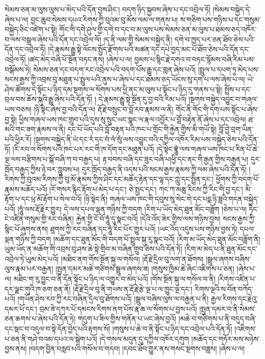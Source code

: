 སེམས་ཅན་མ་ལུས་ལུས་པ་མེད་པའི་དོན་བྱས་ཤིང་། བདག་ཉིད་སྐྱབས་ཞེས་པ་དང་འབྲེལ་ཏོ། །སེམས་བསྐྱེད་དེ་ཞེས་པ་ལ། བྱང་ཆུབ་སེམས་དཔའ་རིགས་ཀྱི་བུའམ་བུ་མོས་ལམ་ལ་གནས་པ། ས་གཅིག་པས་གཉིས་པ་དང་གསུམ་བསྐྱེད་ཅིང་འཛེག་པ་སྟེ། གོང་གི་དགེ་ཤུལ་གྱི་དགེ་བ་དང་བ་མ་ལུས་པས་སེམས་ཅན་མ་ལུས་པ་ཐམས་ཅད་འཁོར་བ་ལས་བསྒྲལ་ཞེས་པའི་དོན་དང་འབྲེལ་ལོ། །ད་ནི་ལམ་གྱི་སེམས་བསྐྱེད་ནི། དགེ་བ་ཁྱད་པར་ཅན་ཐོབ་ཅེས་པའི་དོན་དང་འབྲེལ་ཏོ། །དེ་རྣམས་རྒྱུ་སྟེ་ལོངས་སྤྱོད་རྫོགས་པའི་མཚན་དང་དཔེ་བྱད་མང་པོ་ཐོབ་ཅེས་པའི་དོན་དང་འབྲེལ་ཏོ། །ཚད་མེད་བཞི་པོ་སྔོན་བཏང་ནས། །ཞེས་པ་ལ། བྱམས་པ་སྙིང་རྗེ་དགའ་བ་བཏང་སྙོམས་བཞི་རིམ་པས་བསྒོམས་ཏེ། སེམས་ཅན་དང་བདག་རང་འབྲེལ་པའི་བདག་པོས་རྒྱུ་དང་གླན་ཞེས་པའོ། །སྤྲུལ་པ་དཔག་ཏུ་མེད་པས་སངས་རྒྱས་ཀྱི་འབྲས་བུ་མཐུན་པ་སྤྲུལ་པའི་ནུས་པ་ཞེས་པ་དང་ཐམས་ཅད་ཡོངས་སུ་དག་པ་ལས་ཞེས་པ་ལ། ཡེ་ཤེས་ཚོགས་དེ་སྟོང་པ་ཉིད་དམ་སྔགས་ལ་སོགས་པས་ཕྱི་ནང་མ་ལུས་པ་སྟོང་པ་ཉིད་དུ་གནས་པ་སྟེ། སྤྲོས་པ་དང་བྲལ་བས་ཆོས་སྐུའི་རྒྱུ་ཞེས་པའི་དོན་ཏོ། །
དེ་རྣམས་རྒྱུ་སྟེ་སྔོན་དུ་བྱ་བའི་རིམ་པའོ། །སྔགས་བསྐྱེད་འབྱུང་བ་གཞལ་ཡས་བཅས། །ཉི་སྟེང་ཞེས་བྱ་བའི་དོན་ལ། རྡོ་རྗེ་བསྲུང་བ་བློ་རབ་རྣམས་ལ་ནི། གོང་ནི་གོང་གི་དག་པས་སྟོང་པ་ཞེས་བྱ་སྟེ། ཕྱིས་གཞལ་ཡས་ཁང་གྲུབ་པའི་དུས་སུ་སྲུང་ཡང་སྣང་ལ་རྣལ་འབྱོར་པ་བློ་བརྟེན་ནོ་ཞེས་པ་དང་འབྲེལ། ཐ་མའི་གང་ཟག་རྣམས་ལ་ནི། དང་པོ་ཡོད་པའི་བློ་བརྟན་པའི་ཁང་པ་གྲོང་གི་རྐྱེན་གྱིས་མི་གཡོ་སྟེ། བློ་བྱེ་བྲག་ཡིན་པའི་ཕྱིར་རོ། །སྔགས་བསྐྱེད་ནི་ཡཾ་དང་རཾ་དང་བཾ་ལཾ་སུཾ་ལས་འབྱུང་བའི་དཀྱིལ་འཁོར་རིམ་པས་བསྐྱེད་ཅེས་པའི་དོན་ཏོ། །རི་རབ་ལ་སོགས་པའི་ཁང་པར་རང་གི་ཁ་དོག་དང་མཐུན་པའོ། །དེ་སྟེང་བྷཱུཾ་ལས་གཞལ་ཡས་ཁང་པ་རིན་པོ་ཆེ་ལྔ་ལས་བརྩིགས་པ་སྒོ་བཞི་ཀ་བ་བརྒྱད་པ། རྟ་བབས་བཞི་དང་ཟུར་བཞི་པ།ཕྱི་དང་ནང་གི་རྒྱན་གྱིས་བརྒྱན་པ། དུར་ཁྲོད་བརྒྱད་ཀྱིས་ཉེ་བར་ཀླུབས་པ། དུར་ཁྲོད་བརྒྱད་ནི་འདས་པའི་སངས་རྒྱས་རྣམས་ཀྱི་ལམ་ཞེས་པའི་དོན་ཏོ། །རིགས་ཀྱི་བུའམ་རིགས་ཀྱི་བུ་མོ་རྣམས་ཀྱིས་ཤིང་དང་མཆོད་རྟེན་དང་ལྷ་དང་ཀླུ་དང་སྤྲིན་དང་། ཕྱོགས་ཀྱི་བདག་པོ་རྣམས་མཆོད་པའོ། །རོ་གསར་རྙིང་རྟོག་པ་མེད་པ་དང་། ཅེ་སྤྱང་དང་། ཀང་ཀ་མཆུ་{རིངས་ཀྱི་རིང་གི་}བྱ་དང་། མི་རྟོག་པ་དང་ཕྲ་མོ་རྟོག་པ་སེལ་བའོ། །ཉི་སྟེང་ནི། གཞལ་ཡས་ཁང་གི་དབུས་སུ་སེང་གེ་དང་པདྨ་ཉི་ཟླའི་གདན་བསྐྱེད་པའོ། །ཧཱུཾ་ལས་རྡོ་རྗེར་གྱུར། དེ་ལས་དཔལ་ལྡན་གཉིས་ཀྱི་བདག །རིག་པ་ཡོད་མེད་ཐུན་མོང་བཟློག །ཅེས་པ་ལ། ཏིང་ངེ་འཛིན་གསུམ་གྱི་རང་བཞིན། རྐྱེན་གྱི་ངོ་བོ་ཧཱུཾ་དུ་སྣང་བའོ། །དེའི་འོད་ཟེར་གྱིས་ལས་གཉིས་བྱས། སངས་རྒྱས་ཀྱི་སྙིང་པོ་ཞུགས་ནས། ཐུགས་ཀྱི་རང་བཞིན་དང་ཧཱུཾ་རིང་པོར་གྱུར་པའོ། །ཡང་འོད་འདུས་པས་གཉིས་བྱས་ཏེ། དཔལ་ལྡན་གཉིས་ཀྱི་བདག །མཆོག་དང་ཐུན་མོང་གི་བདག་པོ་སྤྲུལ་སྐུ་རུ་སྣང་བའོ། །རིག་མ་ཡོད་མེད་ཐུན་མོང་བཟློག་ནི། ཡུམ་ཡོད་ན་མཆོག་གི་འབྲས་བུ་ཤས་ཆེ་སྟེ་གྲིབ་མ་བཞིན་གྲུབ་ཅེས་པའི་དོན་ཏོ། །རིག་མ་མེད་པ་ནི་ཐུན་མོང་དང་འབྲེལ་ཏེ་ཡུམ་མེད་པའོ། །མཐིང་ནག་གོས་སྔོན་སྐུ་ལ་གསོལ། །རྡོ་རྗེ་དྲིལ་བུ་ལག་ན་ཐོགས། །སྦྲུལ་ཞགས་བཞིས་ལུས་རྣམ་པར་བརྒྱན། །སྤྱན་དམར་མཆེ་གཙིགས་སྦྲུལ་ཞགས་ཟ། །གསུས་ཁྱིམ་ཆེ་ཞིང་འཇིགས་པ་ཅན། །ཞེས་པ་ལ། མཐིང་ག་རུ་བྱུང་བ་ནི་དོན་སྟོང་པ་ཉིད་ལ་འགྱུར་བ་མེད་པའོ། །གོས་སྔོན་སྐུ་ལ་གསོལ་བ་ནི། །རིགས་འཛིན་པ་དར་ལྗང་གུའི་ཁ་ཅག་ཅན་ནོ། །རྡོ་རྗེ་དྲིལ་བུ་ནི་གཡས་ན་རྡོ་རྗེ་རྩེ་ལྔ་པ་ལ་ཁྱུང་ལྔ་དང་། རིགས་ལྔའི་ས་བོན་བཀོད་པའོ། །གཡོན་ཤེས་རབ་ཀྱི་རང་བཞིན་དྲིལ་བུ་ཐོགས་པའོ། །སྦྲུལ་བཞིས་ལུས་ལ་བརྒྱན་པ་ནི། རྒྱལ་རིགས་དང་རྗེའུ་དམར་པོ་དང་། བྲམ་ཟེ་དཀར་པོ་དམངས་རིགས་ནག་པོས་རྣ་ཆ་ལ་སོགས་པ་བྱས་པའོ། །སྤྱན་དམར་བ་ནི་སེམས་ཅན་ཆགས་པ་ཞེས་པའི་དོན་ཏེ། གདུག་པ་ཟིལ་གྱིས་གནོན་པ་ཡང་ཞེས་བྱའོ། །མཆེ་བ་གཙིགས་པ་ནི་བདུད་བཞི་དང་སྡང་བ་འདུལ་བ་སྟེ་དོན་བྱེད་པའི་རྟགས་སོ། །གསུས་པ་ཆེ་བ་ནི་སྟོང་པ་ཉིད་དང་འབྲེལ་པའི་དོན་ཏོ། །འཇིགས་པ་ཅན་ནི་གཤེ་བའམ་དཔའ་ལ་སྒེག་པའོ། །དེ་གསལ་མདུན་དུ་དཀྱིལ་འཁོར་དགུག །མཆོད་དང་གཏོར་མས་མཉེས་བྱས་ནས། །བདག་བྱིན་བརླབ་པའི་གསོལ་བ་གདབ། །དབང་ཐོབ་གྱུར་ནས་གསང་སྔགས་བཟླས། །ཞེས་པ་ལ། 